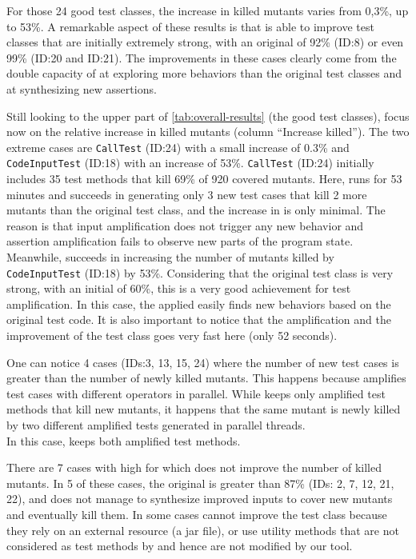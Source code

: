 For those 24 good test classes, the increase in killed mutants varies from 0,3\%, up to 53\%.
A remarkable aspect of these results is that \dspot is able to improve test classes that are initially extremely strong, with an original \ms of 92\% (ID:8) or even 99\% (ID:20 and ID:21). 
The improvements in these cases clearly come from the double capacity of \dspot at exploring more behaviors than the original test classes and at synthesizing new assertions.

Still looking to the upper part of \autoref{tab:overall-results} (the good test classes), focus now on the relative increase in killed mutants (column ``Increase killed''). 
The two extreme cases are \texttt{CallTest} (ID:24) with a small increase of 0.3\% and \texttt{CodeInputTest} (ID:18) with an increase of 53\%.
\texttt{CallTest} (ID:24) initially includes 35 test methods that kill 69\% of 920 covered mutants. 
Here, \dspot runs for 53 minutes and succeeds in generating only 3 new test cases that kill 2 more mutants than the original test class, and the increase in \ms is only minimal. 
The reason is that input amplification does not trigger any new behavior and assertion amplification fails to observe new parts of the program state. 
Meanwhile, \dspot succeeds in increasing the number of mutants killed by \texttt{CodeInputTest} (ID:18) by 53\%.
Considering that the original test class is very strong, with an initial \ms of 60\%, this is a very good achievement for test amplification. 
In this case, the \Iampl applied easily finds new behaviors based on the original test code.
It is also important to notice that the amplification and the improvement of the test class goes very fast here (only 52 seconds). 

One can notice 4 cases (IDs:3, 13, 15, 24) where the number of new test cases is greater than the number of newly killed mutants. 
This happens because \dspot amplifies test cases with different operators in parallel. 
While \dspot keeps only amplified test methods that kill new mutants, it happens that the same mutant is newly killed by two different amplified tests generated in parallel threads. \\
In this case, \dspot keeps both amplified test methods.

There are 7 cases with high \ms for which \dspot does not improve the number of killed mutants. 
In 5 of these cases, the original \ms is greater than 87\% (IDs: 2, 7, 12, 21, 22), and \dspot does not manage to synthesize improved inputs to cover new mutants and eventually kill them.
In some cases \dspot cannot improve the test class because they rely on an external resource (a jar file), or use utility methods that are not considered as test methods by \dspot and hence are not modified by our tool.

